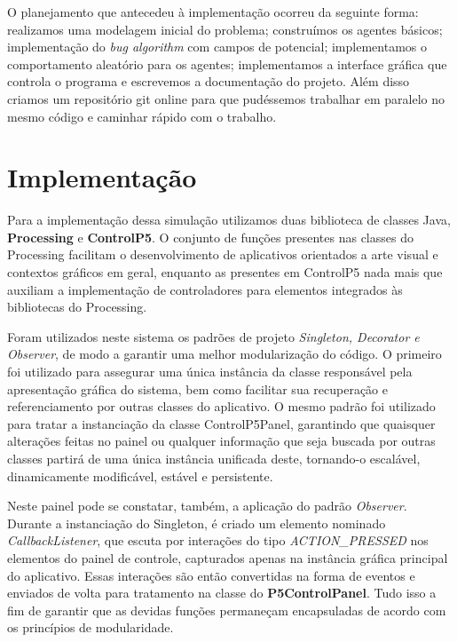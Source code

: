 \documentclass[12pt]{article}
\begin{document}
O planejamento que antecedeu à implementação ocorreu da seguinte forma: realizamos uma modelagem inicial do problema; construímos os agentes básicos; implementação do \textit{bug algorithm} com campos de potencial; implementamos o comportamento aleatório para os agentes; implementamos a interface gráfica que controla o programa e escrevemos a documentação do projeto. Além disso criamos um repositório git online para que pudéssemos trabalhar em paralelo no mesmo código e caminhar rápido com o trabalho.

\section{Implementação}
\label{implementacao}

Para a implementação dessa simulação utilizamos duas biblioteca de classes Java, \textbf{Processing} e \textbf{ControlP5}. O conjunto de
funções presentes nas classes do Processing facilitam o desenvolvimento de aplicativos orientados a arte visual e contextos gráficos em geral,
enquanto as presentes em ControlP5 nada mais que auxiliam a implementação de controladores para elementos integrados às bibliotecas do Processing. 

Foram utilizados neste sistema os padrões de projeto \textit{Singleton, Decorator e Observer}, de modo a garantir uma melhor modularização do código.
O primeiro foi utilizado para assegurar uma única instância da classe responsável pela apresentação gráfica do sistema, bem como facilitar sua
recuperação e referenciamento por outras classes do aplicativo. O mesmo padrão foi utilizado para tratar a instanciação da classe ControlP5Panel,
garantindo que quaisquer alterações feitas no painel ou qualquer informação que seja buscada por outras classes partirá de uma única instância
unificada deste, tornando-o escalável, dinamicamente modificável, estável e persistente. 

Neste painel pode se constatar, também, a aplicação do padrão \textit{Observer}. Durante a instanciação do Singleton, é criado um elemento nominado
\textit{CallbackListener}, que escuta por interações do tipo \textit{ACTION\_PRESSED} nos elementos do painel de controle, capturados apenas na instância gráfica
principal do aplicativo. Essas interações são então convertidas na forma de eventos e enviados de volta para tratamento na classe do \textbf{P5ControlPanel}.
Tudo isso a fim de garantir que as devidas funções permaneçam encapsuladas de acordo com os princípios de modularidade.
\end{document}
